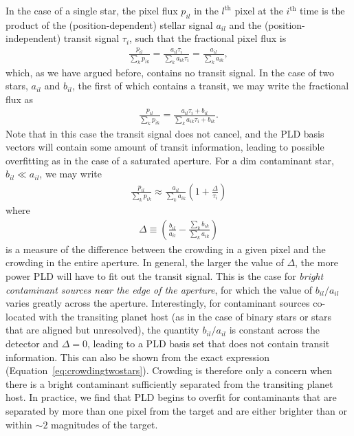 \documentclass[]{emulateapj}
\begin{document}
In the case of a single star, the pixel flux $p_{il}$ in the $l^\mathrm{th}$ pixel at the $i^\mathrm{th}$ time
is the product of the (position-dependent) stellar signal $a_{il}$ and the (position-independent) transit signal $\tau_{i}$,
such that the fractional pixel flux is
\begin{align}
\label{eq:crowdingonestar}
\frac{p_{il}}{\sum\limits_{k}p_{ik}} = \frac{a_{il}\tau_i}{\sum\limits_{k}a_{ik}\tau_i} = \frac{a_{il}}{\sum\limits_{k}a_{ik}},
\end{align}
which, as we have argued before, contains no transit signal. In the case of two stars, $a_{il}$ and $b_{il}$, 
the first of which contains a transit, we may write the fractional flux as
\begin{align}
\label{eq:crowdingtwostars}
\frac{p_{il}}{\sum\limits_{k}p_{ik}} = \frac{a_{il}\tau_i + b_{il}}{\sum\limits_{k}a_{ik}\tau_i + b_{ik}}.
\end{align}
Note that in this case the transit signal does not cancel, and the PLD basis vectors will contain some amount of
transit information, leading to possible overfitting as in the case of a saturated aperture. For a 
dim contaminant star, $b_{il} \ll a_{il}$, we may write
\begin{align}
\label{eq:crowdingtwostarsapprox}
\frac{p_{il}}{\sum\limits_{k}p_{ik}} \approx \frac{a_{il}}{\sum\limits_{k}a_{ik}}\left(1 + \frac{\Delta}{\tau_i}\right)
\end{align}
where\begin{align}
\label{eq:deltacrowding}
\Delta \equiv \left(\frac{b_{il}}{a_{il}} - \frac{\sum\limits_{k}b_{ik}}{\sum\limits_{k}a_{ik}}\right)
\end{align}
is a measure of the difference between the crowding in a given pixel and the crowding
in the entire aperture. In general, the larger the value of $\Delta$, the more power
PLD will have to fit out the transit signal. This is the case for \emph{bright contaminant
sources near the edge of the aperture}, for which the value of 
$b_{il}/a_{il}$ varies greatly across the aperture. Interestingly, for contaminant
sources co-located with the transiting planet host (as in the case of binary stars
or stars that are aligned but unresolved), the quantity $b_{il}/a_{il}$ is constant
across the detector and $\Delta = 0$, leading to a PLD basis set that does not contain
transit information. This can also be shown from the exact expression 
(Equation~\ref{eq:crowdingtwostars}). Crowding is therefore only a concern when
there is a bright contaminant sufficiently separated from the transiting planet host.
In practice, we find that PLD begins to overfit for contaminants that are 
separated by more than one pixel from the target and are either brighter than
or within $\sim 2$ magnitudes of the target.
\end{document}
